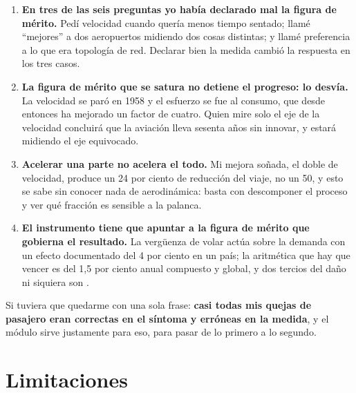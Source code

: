 \documentclass[11pt,letterpaper]{article}
\begin{document}
\begin{enumerate}
\item \textbf{En tres de las seis preguntas yo había declarado mal la figura de
  mérito.} Pedí velocidad cuando quería menos tiempo sentado; llamé
  \enquote{mejores} a dos aeropuertos midiendo dos cosas distintas; y llamé
  preferencia a lo que era topología de red. Declarar bien la medida cambió la
  respuesta en los tres casos.
\item \textbf{La figura de mérito que se satura no detiene el progreso: lo
  desvía.} La velocidad se paró en 1958 y el esfuerzo se fue al consumo, que
  desde entonces ha mejorado un factor de cuatro. Quien mire solo el eje de la
  velocidad concluirá que la aviación lleva sesenta años sin innovar, y estará
  midiendo el eje equivocado.
\item \textbf{Acelerar una parte no acelera el todo.} Mi mejora soñada, el doble
  de velocidad, produce un 24 por ciento de reducción del viaje, no un 50, y
  esto se sabe sin conocer nada de aerodinámica: basta con descomponer el
  proceso y ver qué fracción es sensible a la palanca.
\item \textbf{El instrumento tiene que apuntar a la figura de mérito que
  gobierna el resultado.} La vergüenza de volar actúa sobre la demanda con un
  efecto documentado del 4 por ciento en un país; la aritmética que hay que
  vencer es del 1,5 por ciento anual compuesto y global, y dos tercios del daño
  ni siquiera son .
\end{enumerate}

Si tuviera que quedarme con una sola frase: \textbf{casi todas mis quejas de
pasajero eran correctas en el síntoma y erróneas en la medida}, y el módulo
sirve justamente para eso, para pasar de lo primero a lo segundo.

\section{Limitaciones}
\end{document}
